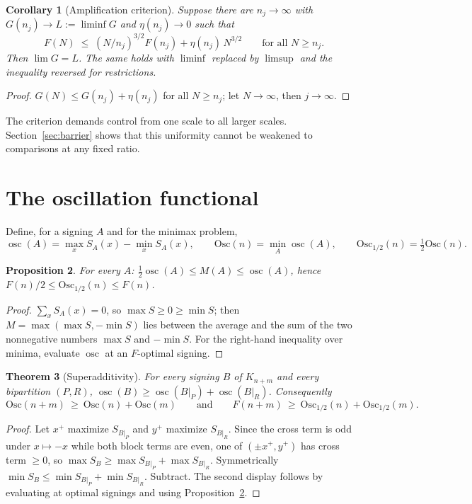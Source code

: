 \documentclass[11pt]{article}
\newtheorem{theorem}{Theorem}[section]
\newtheorem{proposition}[theorem]{Proposition}
\newtheorem{corollary}[theorem]{Corollary}
\theoremstyle{remark}
\newcommand{\Osc}{\mathrm{Osc}}
\begin{document}
\begin{corollary}[Amplification criterion]\label{cor:amp}
Suppose there are $n_j\to\infty$ with $G(n_j)\to L:=\liminf G$ and
$\eta(n_j)\to0$ such that
\[
 F(N)\;\le\;(N/n_j)^{3/2}F(n_j)+\eta(n_j)\,N^{3/2}
 \qquad\text{for all }N\ge n_j .
\]
Then $\lim G=L$. The same holds with $\liminf$ replaced by $\limsup$
and the inequality reversed for restrictions.
\end{corollary}
\begin{proof}
$G(N)\le G(n_j)+\eta(n_j)$ for all $N\ge n_j$; let $N\to\infty$, then
$j\to\infty$.
\end{proof}

The criterion demands control from one scale to all larger scales.
Section~\ref{sec:barrier} shows that this uniformity cannot be
weakened to comparisons at any fixed ratio.

\section{The oscillation functional}\label{sec:osc}

Define, for a signing $A$ and for the minimax problem,
\[
 \operatorname{osc}(A)=\max_xS_A(x)-\min_xS_A(x),\qquad
 \Osc(n)=\min_A\operatorname{osc}(A),\qquad
 \Osc_{1/2}(n)=\tfrac12\Osc(n).
\]

\begin{proposition}\label{prop:oscbasic}
For every $A$: $\tfrac12\operatorname{osc}(A)\le M(A)\le\operatorname{osc}(A)$,
hence $F(n)/2\le\Osc_{1/2}(n)\le F(n)$.
\end{proposition}
\begin{proof}
$\sum_xS_A(x)=0$, so $\max S\ge0\ge\min S$; then
$M=\max(\max S,-\min S)$ lies between the average and the sum of the
two nonnegative numbers $\max S$ and $-\min S$. For the right-hand
inequality over minima, evaluate $\operatorname{osc}$ at an
$F$-optimal signing.
\end{proof}

\begin{theorem}[Superadditivity]\label{thm:oscsuper}
For every signing $B$ of $K_{n+m}$ and every bipartition $(P,R)$,
$\operatorname{osc}(B)\ge\operatorname{osc}(B|_P)+\operatorname{osc}(B|_R)$.
Consequently
\[
 \Osc(n+m)\ \ge\ \Osc(n)+\Osc(m)
 \qquad\text{and}\qquad
 F(n+m)\ \ge\ \Osc_{1/2}(n)+\Osc_{1/2}(m).
\]
\end{theorem}
\begin{proof}
Let $x^+$ maximize $S_{B|_P}$ and $y^+$ maximize $S_{B|_R}$. Since the
cross term is odd under $x\mapsto-x$ while both block terms are even,
one of $(\pm x^+,y^+)$ has cross term $\ge0$, so
$\max S_B\ge\max S_{B|_P}+\max S_{B|_R}$. Symmetrically
$\min S_B\le\min S_{B|_P}+\min S_{B|_R}$. Subtract. The second display
follows by evaluating at optimal signings and using
Proposition~\ref{prop:oscbasic}.
\end{proof}
\end{document}

